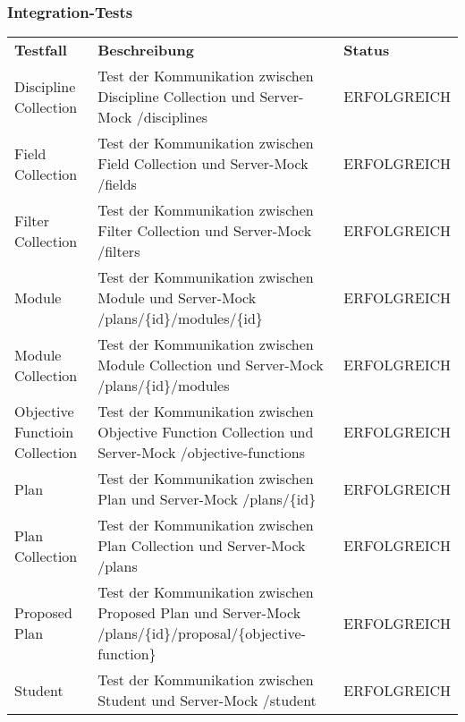 \subsubsection*{Integration-Tests}
\begin{longtable}{| >{\hspace{0pt}} p{} | >{\hspace{0pt}} p{} | >{\hspace{0pt}} p{} |}
	\hline
	\textbf{Testfall} & \textbf{Beschreibung} & \textbf{Status} \\ 
	\hhline{|=|=|=|}  
	\endfirsthead
	\endhead
	
	Discipline Collection & Test der Kommunikation zwischen Discipline Collection und Server-Mock /disciplines & ERFOLGREICH \\ \hline
	Field Collection & Test der Kommunikation zwischen Field Collection und Server-Mock /fields & ERFOLGREICH \\ \hline
	Filter Collection & Test der Kommunikation zwischen Filter Collection und Server-Mock /filters & ERFOLGREICH \\ \hline
	Module & Test der Kommunikation zwischen Module und Server-Mock /plans/\{id\}/modules/\{id\} & ERFOLGREICH \\ \hline
	Module Collection & Test der Kommunikation zwischen Module Collection und Server-Mock /plans/\{id\}/modules & ERFOLGREICH \\ \hline
	Objective Functioin Collection & Test der Kommunikation zwischen Objective Function Collection und Server-Mock /objective-functions  & ERFOLGREICH \\ \hline
	Plan & Test der Kommunikation zwischen Plan und Server-Mock /plans/\{id\} & ERFOLGREICH \\ \hline
	Plan Collection & Test der Kommunikation zwischen Plan Collection und Server-Mock /plans & ERFOLGREICH \\ \hline
	Proposed Plan & Test der Kommunikation zwischen Proposed Plan und Server-Mock /plans/\{id\}/proposal/\{objective-function\} & ERFOLGREICH \\ \hline
	Student & Test der Kommunikation zwischen Student und Server-Mock /student & ERFOLGREICH \\ \hline
	
\end{longtable}